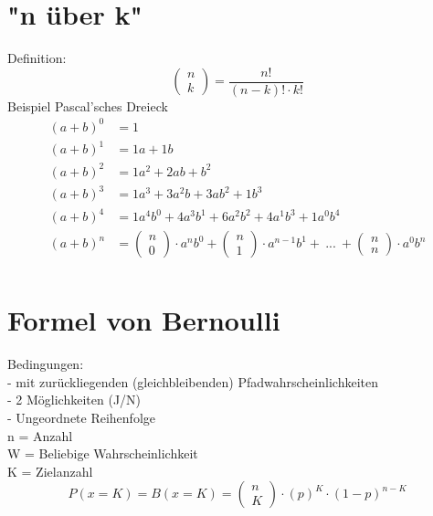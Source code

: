 \documentclass[a4paper,12pt]{article}
\begin{document}
\section*{"n über k"}
Definition:
$$\begin{pmatrix}n\\k\end{pmatrix} = \frac{n!}{(n - k)! \cdot k!}$$
Beispiel Pascal'sches Dreieck
\begin{equation*}
\begin{split}
(a + b)^0 & = 1\\
(a + b)^1 & = 1a + 1b\\
(a + b)^2 & = 1a^2 + 2ab + b^2\\
(a + b)^3 & = 1a^3 + 3a^2b + 3ab^2 + 1b^3\\
(a + b)^4 & = 1a^4b^0 + 4a^3b^1 + 6a^2b^2 + 4a^1b^3 + 1a^0b^4\\
(a + b)^n & = \begin{pmatrix}n\\0\end{pmatrix} \cdot a^nb^0 + \begin{pmatrix}n\\1\end{pmatrix} \cdot a^{n-1}b^1 +\ ...\ + \begin{pmatrix}n\\n\end{pmatrix} \cdot a^0b^n\\
\end{split}
\end{equation*}
\section*{Formel von Bernoulli}
\large{Bedingungen:}\\
- mit zurückliegenden (gleichbleibenden) Pfadwahrscheinlichkeiten\\
- 2 Möglichkeiten (J/N)\\
- Ungeordnete Reihenfolge\\
n = Anzahl\\
W = Beliebige Wahrscheinlichkeit\\
K = Zielanzahl\\ 

$$P(x=K) = B(x=K) = \begin{pmatrix}n\\K\end{pmatrix} \cdot (p)^K \cdot (1 - p)^{n -K}$$\\
\end{document}
